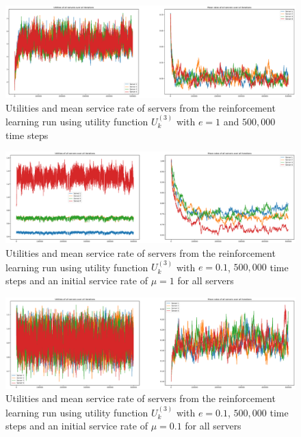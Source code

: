 \begin{figure}[H]
    \includegraphics[width=\textwidth]{chapters/00_appendix/03_more_rl_results/Bin/utility_3_eps/u3_2_e1.eps}
    \caption{Utilities and mean service rate of servers from the reinforcement
    learning run using utility function \(U_k^{(3)}\) with \(e = 1\) and
    \(500,\!000\) time steps}
    \label{fig:RL_utility3_2_e1}
\end{figure}

\begin{figure}[H]
    \includegraphics[width=\textwidth]{chapters/00_appendix/03_more_rl_results/Bin/utility_3_eps/u3_3_initial_1.eps}
    \caption{Utilities and mean service rate of servers from the reinforcement
    learning run using utility function \(U_k^{(3)}\) with \(e = 0.1\),
    \(500,\!000\) time steps and an initial service rate of \(\mu = 1\) for all
    servers}
    \label{fig:RL_utility3_3_initial_1}
\end{figure}

\begin{figure}[H]
    \includegraphics[width=\textwidth]{chapters/00_appendix/03_more_rl_results/Bin/utility_3_eps/u3_3_initial_01.eps}
    \caption{Utilities and mean service rate of servers from the reinforcement
    learning run using utility function \(U_k^{(3)}\) with \(e = 0.1\),
    \(500,\!000\) time steps and an initial service rate of \(\mu = 0.1\) for all
    servers}
    \label{fig:RL_utility3_3_initial_01}
\end{figure}


